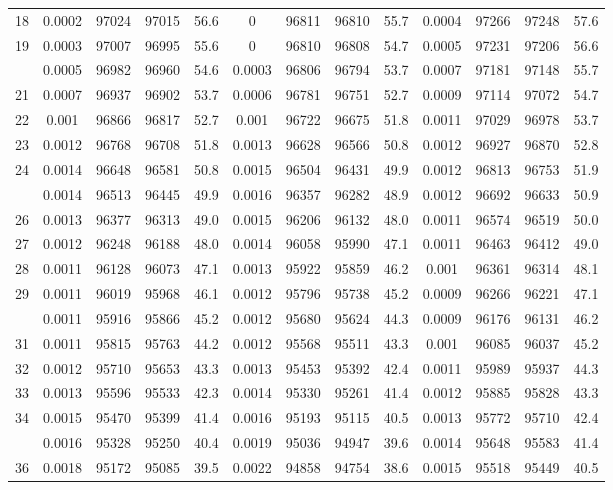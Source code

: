 \documentclass[
  14pt,
]{article}
\begin{document}
\begin{longtable}[t]{lcccccccccccc}
18 & 0.0002 & 97024 & 97015 & 56.6 & 0 & 96811 & 96810 & 55.7 & 0.0004 & 97266 & 97248 & 57.6\\
19 & 0.0003 & 97007 & 96995 & 55.6 & 0 & 96810 & 96808 & 54.7 & 0.0005 & 97231 & 97206 & 56.6\\
\addlinespace
20 & 0.0005 & 96982 & 96960 & 54.6 & 0.0003 & 96806 & 96794 & 53.7 & 0.0007 & 97181 & 97148 & 55.7\\
21 & 0.0007 & 96937 & 96902 & 53.7 & 0.0006 & 96781 & 96751 & 52.7 & 0.0009 & 97114 & 97072 & 54.7\\
22 & 0.001 & 96866 & 96817 & 52.7 & 0.001 & 96722 & 96675 & 51.8 & 0.0011 & 97029 & 96978 & 53.7\\
23 & 0.0012 & 96768 & 96708 & 51.8 & 0.0013 & 96628 & 96566 & 50.8 & 0.0012 & 96927 & 96870 & 52.8\\
24 & 0.0014 & 96648 & 96581 & 50.8 & 0.0015 & 96504 & 96431 & 49.9 & 0.0012 & 96813 & 96753 & 51.9\\
\addlinespace
25 & 0.0014 & 96513 & 96445 & 49.9 & 0.0016 & 96357 & 96282 & 48.9 & 0.0012 & 96692 & 96633 & 50.9\\
26 & 0.0013 & 96377 & 96313 & 49.0 & 0.0015 & 96206 & 96132 & 48.0 & 0.0011 & 96574 & 96519 & 50.0\\
27 & 0.0012 & 96248 & 96188 & 48.0 & 0.0014 & 96058 & 95990 & 47.1 & 0.0011 & 96463 & 96412 & 49.0\\
28 & 0.0011 & 96128 & 96073 & 47.1 & 0.0013 & 95922 & 95859 & 46.2 & 0.001 & 96361 & 96314 & 48.1\\
29 & 0.0011 & 96019 & 95968 & 46.1 & 0.0012 & 95796 & 95738 & 45.2 & 0.0009 & 96266 & 96221 & 47.1\\
\addlinespace
30 & 0.0011 & 95916 & 95866 & 45.2 & 0.0012 & 95680 & 95624 & 44.3 & 0.0009 & 96176 & 96131 & 46.2\\
31 & 0.0011 & 95815 & 95763 & 44.2 & 0.0012 & 95568 & 95511 & 43.3 & 0.001 & 96085 & 96037 & 45.2\\
32 & 0.0012 & 95710 & 95653 & 43.3 & 0.0013 & 95453 & 95392 & 42.4 & 0.0011 & 95989 & 95937 & 44.3\\
33 & 0.0013 & 95596 & 95533 & 42.3 & 0.0014 & 95330 & 95261 & 41.4 & 0.0012 & 95885 & 95828 & 43.3\\
34 & 0.0015 & 95470 & 95399 & 41.4 & 0.0016 & 95193 & 95115 & 40.5 & 0.0013 & 95772 & 95710 & 42.4\\
\addlinespace
35 & 0.0016 & 95328 & 95250 & 40.4 & 0.0019 & 95036 & 94947 & 39.6 & 0.0014 & 95648 & 95583 & 41.4\\
36 & 0.0018 & 95172 & 95085 & 39.5 & 0.0022 & 94858 & 94754 & 38.6 & 0.0015 & 95518 & 95449 & 40.5\\

\end{longtable}
\end{document}

